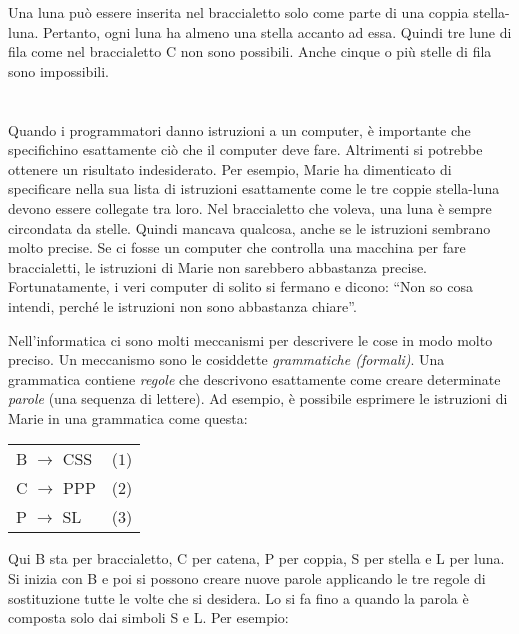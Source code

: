 {{Una luna può essere inserita nel braccialetto solo come parte di una coppia stella-luna. Pertanto, ogni luna ha almeno una stella accanto ad essa. Quindi tre lune di fila come nel braccialetto C non sono possibili. Anche cinque o più stelle di fila sono impossibili.

{\centering%
\par}



\section*{\BrochureItsInformatics}
Quando i programmatori danno istruzioni a un computer, è importante che specifichino esattamente ciò che il computer deve fare. Altrimenti si potrebbe ottenere un risultato indesiderato. Per esempio, Marie ha dimenticato di specificare nella sua lista di istruzioni esattamente come le tre coppie stella-luna devono essere collegate tra loro. Nel braccialetto che voleva, una luna è sempre circondata da stelle. Quindi mancava qualcosa, anche se le istruzioni sembrano molto precise. Se ci fosse un computer che controlla una macchina per fare braccialetti, le istruzioni di Marie non sarebbero abbastanza precise. Fortunatamente, i veri computer di solito si fermano e dicono: “Non so cosa intendi, perché le istruzioni non sono abbastanza chiare”.

Nell’informatica ci sono molti meccanismi per descrivere le cose in modo molto preciso. Un meccanismo sono le cosiddette \emph{grammatiche (formali)}. Una grammatica contiene \emph{regole} che descrivono esattamente come creare determinate \emph{parole} (una sequenza di lettere). Ad esempio, è possibile esprimere le istruzioni di Marie in una grammatica come questa:

\begin{adjustwidth}{1.5em}{0em}
\begin{tabular}{ @{} l l @{} }
  B \ensuremath{\rightarrow} CSS & ($1$) \\ 
  C \ensuremath{\rightarrow} PPP & ($2$) \\ 
  P \ensuremath{\rightarrow} SL & ($3$)
\end{tabular}


\end{adjustwidth}

Qui B sta per braccialetto, C per catena, P per coppia, S per stella e L per luna. Si inizia con B e poi si possono creare nuove parole applicando le tre regole di sostituzione tutte le volte che si desidera. Lo si fa fino a quando la parola è composta solo dai simboli S e L. Per esempio:

}}
